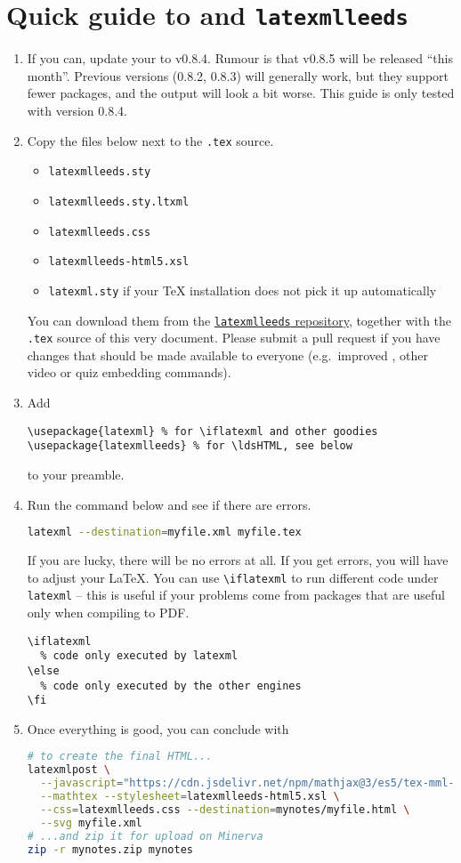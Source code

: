 \documentclass[a4paper]{article}
\def\ltxinline{\lstinline[style=latexml]}
\theoremstyle{definition}
\begin{document}
\tableofcontents

\section{Quick guide to \texorpdfstring{\LaTeXML{}}{LaTeXML} and \texttt{latexmlleeds}}
\begin{enumerate}
  \item If you can, update your \LaTeXML{} to v0.8.4. Rumour is that v0.8.5 will be released ``this month''. Previous versions (0.8.2, 0.8.3) will generally work, but they support fewer packages, and the output will look a bit worse. This guide is only tested with version 0.8.4.
  \item Copy the files below next to the \verb|.tex| source.
  \begin{itemize}
    \item \verb|latexmlleeds.sty|
    \item \verb|latexmlleeds.sty.ltxml|
    \item \verb|latexmlleeds.css|
    \item \verb|latexmlleeds-html5.xsl|
    \item \verb|latexml.sty| if your \TeX{} installation does not pick it up automatically
  \end{itemize}
  You can download them from the \href{https://dev.azure.com/pmtvlm-leeds-ac-uk/public/_git/latexmlleeds}{\texttt{latexmlleeds} repository}, together with the \verb|.tex| source of this very document. Please submit a pull request if you have changes that should be made available to everyone (e.g.\ improved \CSS{}, other video or quiz embedding commands).
  \item Add
  \begin{lstlisting}[style=latexml]
\usepackage{latexml} % for \iflatexml and other goodies
\usepackage{latexmlleeds} % for \ldsHTML, see below
  \end{lstlisting}
  to your preamble.
  \item Run the command below and see if there are errors.
  \begin{lstlisting}[language=bash]
latexml --destination=myfile.xml myfile.tex
  \end{lstlisting}
  If you are lucky, there will be no errors at all. If you get errors, you will have to adjust your \LaTeX{}. You can use \ltxinline|\iflatexml| to run different code under \verb|latexml| -- this is useful if your problems come from packages that are useful only when compiling to PDF.
  \begin{lstlisting}[style=latexml]
\iflatexml
  % code only executed by latexml
\else
  % code only executed by the other engines
\fi
  \end{lstlisting}
  \item Once everything is good, you can conclude with
  \begin{lstlisting}[language=bash]
# to create the final HTML...
latexmlpost \
  --javascript="https://cdn.jsdelivr.net/npm/mathjax@3/es5/tex-mml-chtml.js" \
  --mathtex --stylesheet=latexmlleeds-html5.xsl \
  --css=latexmlleeds.css --destination=mynotes/myfile.html \
  --svg myfile.xml
# ...and zip it for upload on Minerva
zip -r mynotes.zip mynotes


\end{lstlisting}
\end{enumerate}
\end{document}
